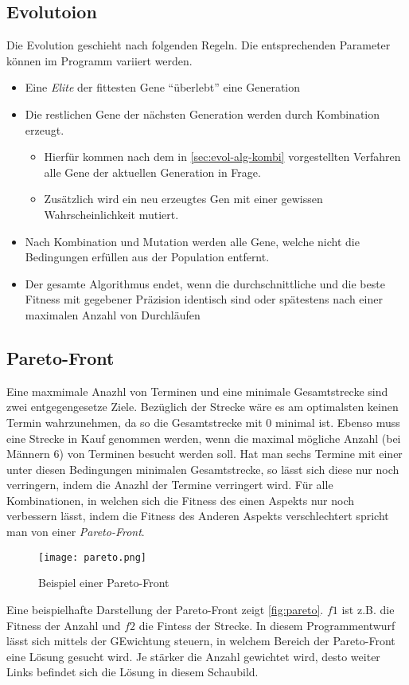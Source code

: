 \subsection{Evolutoion}
Die Evolution geschieht nach folgenden Regeln.
Die entsprechenden Parameter können im Programm variiert werden.
\begin{itemize}
    \item Eine \emph{Elite} der fittesten Gene \enquote{überlebt} eine Generation
    \item Die restlichen Gene der nächsten Generation werden durch Kombination erzeugt.
    \begin{itemize}
        \item Hierfür kommen nach dem in \autoref{sec:evol-alg-kombi} vorgestellten Verfahren alle Gene der aktuellen Generation in Frage.
        \item Zusätzlich wird ein neu erzeugtes Gen mit einer gewissen Wahrscheinlichkeit mutiert.
    \end{itemize}
    \item Nach Kombination und Mutation werden alle Gene, welche nicht die Bedingungen erfüllen aus der Population entfernt.
    \item Der gesamte Algorithmus endet, wenn die durchschnittliche und die beste Fitness mit gegebener Präzision identisch sind oder spätestens nach einer maximalen Anzahl von Durchläufen
\end{itemize}

\subsection{Pareto-Front}
Eine maxmimale Anazhl von Terminen und eine minimale Gesamtstrecke sind zwei entgegengesetze Ziele.
Bezüglich der Strecke wäre es am optimalsten keinen Termin wahrzunehmen,
da so die Gesamtstrecke mit $0$ minimal ist.
Ebenso muss eine Strecke in Kauf genommen werden,
wenn die maximal mögliche Anzahl (bei Männern $6$) von Terminen besucht werden soll.
Hat man sechs Termine mit einer unter diesen Bedingungen minimalen Gesamtstrecke,
so lässt sich diese nur noch verringern, indem die Anazhl der Termine verringert wird.
Für alle Kombinationen, in welchen sich die Fitness des einen Aspekts nur noch verbessern lässt,
indem die Fitness des Anderen Aspekts verschlechtert spricht man von einer \emph{Pareto-Front}.

\begin{figure}[h]
    \centering
    \texttt{[image: pareto.png]}
    \caption{Beispiel einer Pareto-Front \cite{Paretofr62:online}}
    \label{fig:pareto}
\end{figure}

Eine beispielhafte Darstellung der Pareto-Front zeigt \autoref{fig:pareto}.
$f1$ ist z.B. die Fitness der Anzahl und $f2$ die Fintess der Strecke.
In diesem Programmentwurf lässt sich mittels der GEwichtung steuern,
in welchem Bereich der Pareto-Front eine Lösung gesucht wird.
Je stärker die Anzahl gewichtet wird, desto weiter Links befindet sich die Lösung in diesem Schaubild.
